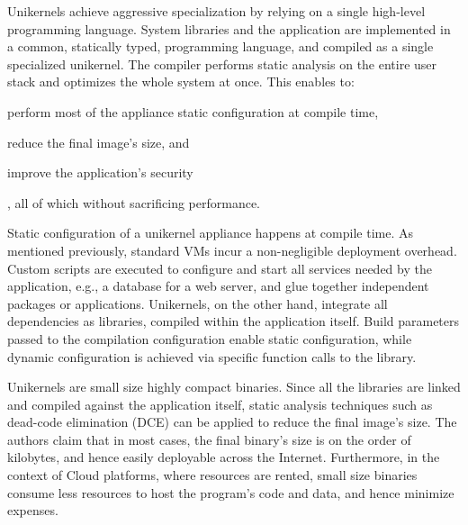 Unikernels achieve aggressive specialization by relying on a single high-level programming language.
System libraries and the application are implemented in a common, statically typed, programming language, and compiled as a single specialized unikernel.
The compiler performs static analysis on the entire user stack and optimizes the whole system at once.
This enables to:
\begin{enumerate*}
	\item perform most of the appliance static configuration at compile time,
	\item reduce the final image's size, and
	\item improve the application's security
\end{enumerate*}, all of which without sacrificing performance.

Static configuration of a unikernel appliance happens at compile time.
As mentioned previously, standard VMs incur a non-negligible deployment overhead.
Custom scripts are executed to configure and start all services needed by the application, e.g., a database for a web server, and glue together independent packages or applications.
Unikernels, on the other hand, integrate all dependencies as libraries, compiled within the application itself.
Build parameters passed to the compilation configuration enable static configuration, while dynamic configuration is achieved via specific function calls to the library.

Unikernels are small size highly compact binaries.
Since all the libraries are linked and compiled against the application itself, static analysis techniques such as dead-code elimination (DCE) can be applied to reduce the final image's size.
The authors claim that in most cases, the final binary's size is on the order of kilobytes, and hence easily deployable across the Internet.
Furthermore, in the context of Cloud platforms, where resources are rented, small size binaries consume less resources to host the program's code and data, and hence minimize expenses.

